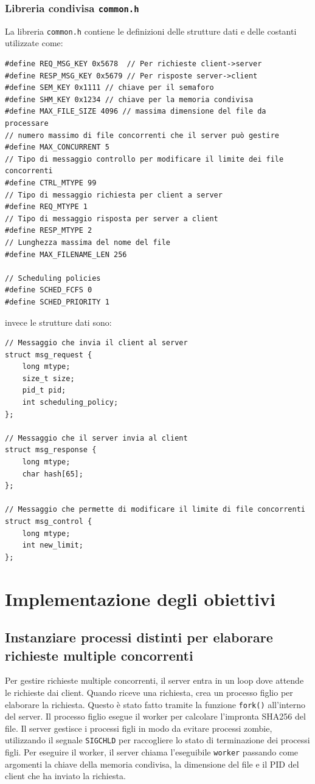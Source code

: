 \documentclass[a4paper]{article}
\begin{document}
\subsubsection{Libreria condivisa \texttt{common.h}}

La libreria \texttt{common.h} contiene le definizioni delle strutture dati e delle costanti utilizzate come:
\begin{verbatim}
#define REQ_MSG_KEY 0x5678  // Per richieste client->server
#define RESP_MSG_KEY 0x5679 // Per risposte server->client
#define SEM_KEY 0x1111 // chiave per il semaforo
#define SHM_KEY 0x1234 // chiave per la memoria condivisa
#define MAX_FILE_SIZE 4096 // massima dimensione del file da processare
// numero massimo di file concorrenti che il server può gestire
#define MAX_CONCURRENT 5 
// Tipo di messaggio controllo per modificare il limite dei file concorrenti
#define CTRL_MTYPE 99 
// Tipo di messaggio richiesta per client a server
#define REQ_MTYPE 1 
// Tipo di messaggio risposta per server a client
#define RESP_MTYPE 2 
// Lunghezza massima del nome del file
#define MAX_FILENAME_LEN 256 

// Scheduling policies
#define SCHED_FCFS 0
#define SCHED_PRIORITY 1
\end{verbatim}
\noindent
invece le strutture dati sono:
\begin{verbatim}
// Messaggio che invia il client al server
struct msg_request {
    long mtype;
    size_t size;
    pid_t pid;
    int scheduling_policy; 
};

// Messaggio che il server invia al client
struct msg_response {
    long mtype;
    char hash[65];
};

// Messaggio che permette di modificare il limite di file concorrenti
struct msg_control {
    long mtype;
    int new_limit;
};
\end{verbatim}


\section{Implementazione degli obiettivi}

\subsection{Instanziare processi distinti per elaborare richieste multiple concorrenti}

Per gestire richieste multiple concorrenti, il server entra in un loop dove attende le richieste dai client.
Quando riceve una richiesta, crea un processo figlio per elaborare la richiesta.
Questo è stato fatto tramite la funzione \texttt{fork()} all'interno del server.
Il processo figlio esegue il worker per calcolare l'impronta SHA256 del file.
Il server gestisce i processi figli in modo da evitare processi zombie, utilizzando il segnale \texttt{SIGCHLD} per raccogliere lo stato di terminazione dei processi figli.
Per eseguire il worker, il server chiama l'eseguibile \texttt{worker} passando come argomenti la chiave della memoria condivisa, la dimensione del file e il PID del client che ha inviato la richiesta.
\end{document}
